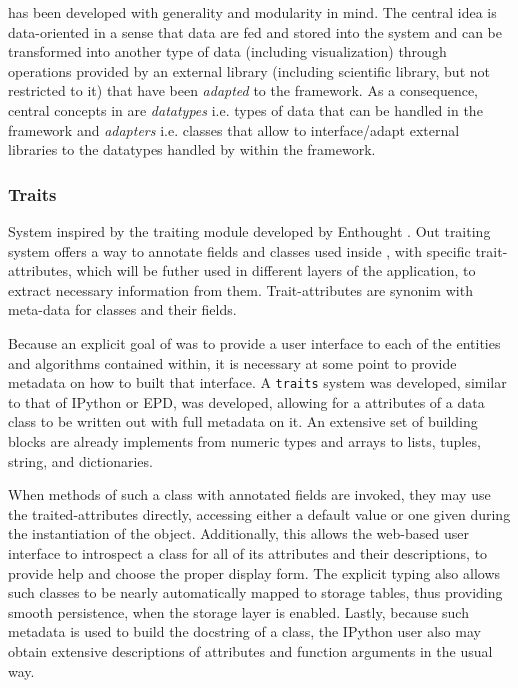 \TVB has been developed with generality and modularity in mind. The central idea is data-oriented in a sense that
data are fed and stored into the system and can be transformed into another type
of data (including visualization) through operations provided by an external
library (including \TVB scientific library, but not restricted to it) that have
been \emph{adapted} to the framework. As a consequence, central concepts in \TVB
are \emph{datatypes} i.e. types of data that can be handled in the framework and
\emph{adapters} i.e. classes that allow to interface/adapt external libraries
to  the datatypes handled by within the framework.

	\subsubsection{\TVB Traits}

System inspired by the traiting module developed by Enthought \cite{Enthought_2001}.
Out traiting system offers a way to annotate fields and classes used inside \TVB, with specific trait-attributes,
which will be futher used in different layers of the application, to extract necessary information from them.
Trait-attributes are synonim with meta-data for classes and their fields.

Because an explicit goal of \TVB was to provide a user interface to each of the
entities and algorithms contained within, it is necessary at some point to
provide metadata on how to built that interface. A \texttt{traits} system was developed, similar to that of
IPython or EPD, was developed, allowing for a attributes of a data class to
be written out with full metadata on it. An extensive set of  building 
blocks are already implements from numeric types and arrays to lists, tuples, 
string, and dictionaries.

 When methods of such a class with annotated fields are invoked,
they may use the traited-attributes directly, accessing either a default value
or one given during the instantiation of the object. Additionally, this allows
the web-based user interface to introspect a class for all of its attributes and their
descriptions, to provide help and choose the proper display form. The explicit typing also allows
such classes to be nearly automatically mapped to storage tables,
thus providing smooth persistence, when the storage layer is enabled.  
Lastly, because such metadata is used to build the docstring of a class,
the IPython user also may obtain extensive descriptions of attributes and
function arguments in the usual way. 

